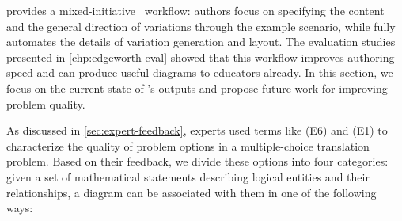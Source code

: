 \Edgeworth provides a mixed-initiative~\cite{allen1999mixedinitiative} workflow: authors focus on specifying the content and the general direction of variations through the example scenario, while \Edgeworth fully automates the details of variation generation and layout. The evaluation studies presented in \cref{chp:edgeworth-eval} showed that this workflow improves authoring speed and can produce useful diagrams to educators already. In this section, we focus on the current state of \Edgeworth's outputs and propose future work for improving problem quality.

As discussed in \cref{sec:expert-feedback}, experts used terms like  (E6) and  (E1) to characterize the quality of problem options in a multiple-choice translation problem. Based on their feedback, we divide these options into four categories: given a set of mathematical statements describing logical entities and their relationships, a diagram can be associated with them in one of the following ways:

